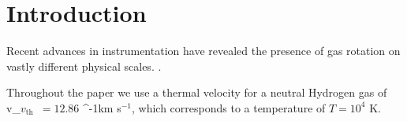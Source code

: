 \documentclass[a4paper,fleqn,usenatbib]{mnras}
\newcommand{\lya}{\ifmmode{{\rm Ly}\alpha}\else Ly$\alpha$\ \fi}
\newcommand{\kms}{\ifmmode\mathrm{km\ s}^{-1}\else km s$^{-1}$\fi}
\newcommand{\vrot}{\ifmmode v_{\mathrm{rot}}\else $v_{\mathrm{rot}}$~\fi}
\newcommand{\vout}{\ifmmode v_{\mathrm{out}}\else $v_{\mathrm{out}}$~\fi}
\newcommand{\tauh}{\ifmmode \tau_{\mathrm{H}}\else $\tau_{\mathrm{H}}$~\fi}
\newcommand{\vth}{\ifmmode v_{\mathrm{th}}\else $v_{\mathrm{th}}$~\fi}
\begin{document}


\section{Introduction}
\label{sec:intro}

Recent advances in instrumentation have revealed the presence of gas
rotation on vastly different physical scales.
\citep[e.g.][]{Herenz2016}.  




Throughout the paper we use a thermal velocity for a neutral Hydrogen
gas of \vth $= 12.86$ \kms, which corresponds to a temperature of
$T=10^4$ K. 


\end{document}
